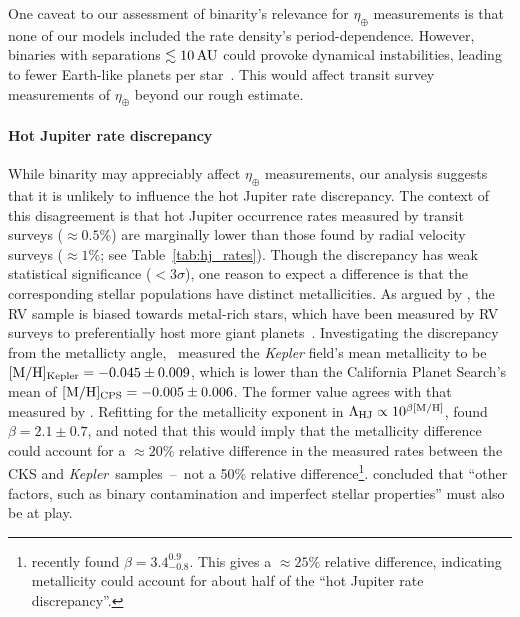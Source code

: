 \documentclass[12pt,modern]{aastex61}
\begin{document}
One caveat to our assessment of binarity's relevance for $\eta_\oplus$
measurements is that none of our models included the rate density's
period-dependence. However, binaries with separations $\lesssim
10\,{\rm AU}$ could provoke dynamical instabilities, leading to fewer
Earth-like planets per
star~\citep[\textit{e.g.},][]{holman_long-term_1999,wang_influence_2014,
kraus_impact_2016}.  This would affect transit survey measurements of
$\eta_\oplus$ beyond our rough estimate.

\paragraph{Hot Jupiter rate discrepancy}
While binarity may appreciably affect $\eta_\oplus$ measurements, our
analysis suggests that it is unlikely to influence the hot Jupiter
rate discrepancy.  The context of this disagreement is that hot
Jupiter occurrence rates measured by transit surveys ($\approx 0.5\%$)
are marginally lower than those found by radial velocity surveys
($\approx 1\%$; see Table~\ref{tab:hj_rates}).  Though the discrepancy
has weak statistical significance ($<3\sigma$), one reason to expect a
difference is that the corresponding stellar populations have distinct
metallicities.  As argued by \citet{gould_frequency_2006}, the RV
sample is biased towards metal-rich stars, which have been measured by
RV surveys to preferentially host more giant
planets~\citep{santos_spectroscopic_2004,fischer_planet-metallicity_2005}.
Investigating the discrepancy from the metallicty
angle,~\citet{guo_metallicity_2017} measured the {\it Kepler} field's
mean metallicity to be $[{\rm M/H}]_{\rm Kepler}= -0.045\pm0.009$,
which is lower than the California Planet Search's mean of $[{\rm
M/H}]_{\rm CPS}= -0.005\pm0.006$.  The former value agrees with that
measured by \citet{dong_metallicities_2014}.  Refitting for the
metallicity exponent in $\Lambda_{\rm HJ} \propto 10^{\beta [{\rm
M/H}] }$, \citeauthor{guo_metallicity_2017}\! found $\beta = 2.1\pm
0.7$, and noted that this would imply that the metallicity difference
could account for a $\approx 20\%$ relative difference in the measured
rates between the CKS and {\it Kepler}\ samples~--~not a 50\% relative
difference\footnote{ \citet{petigura_CKS_2017} recently found $\beta =
3.4^{0.9}_{-0.8}$.  This gives a $\approx 25\%$ relative difference,
indicating metallicity could account for about half of the ``hot
Jupiter rate discrepancy''.  }.  \citeauthor{guo_metallicity_2017}\!
concluded that ``other factors, such as binary contamination and
imperfect stellar properties'' must also be at play.
\end{document}
